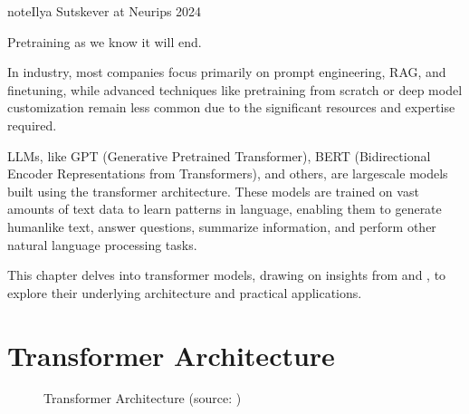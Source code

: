 \documentclass[letterpaper,11pt,english]{sphinxmanual}
\begin{document}
\begin{sphinxadmonition}{note}{Ilya Sutskever at Neurips 2024}

\sphinxAtStartPar
Pre\sphinxhyphen{}training as we know it will end.

\begin{figure}[H]
\centering

\noindent{}
\end{figure}
\end{sphinxadmonition}

\sphinxAtStartPar
In industry, most companies focus primarily on prompt engineering, RAG, and fine\sphinxhyphen{}tuning,
while advanced techniques like pre\sphinxhyphen{}training from scratch or deep model customization
remain less common due to the significant resources and expertise required.

\sphinxAtStartPar
LLMs, like GPT (Generative Pre\sphinxhyphen{}trained Transformer), BERT (Bidirectional Encoder
Representations from Transformers), and others, are large\sphinxhyphen{}scale models built using
the transformer architecture. These models are trained on vast amounts of text data to
learn patterns in language, enabling them to generate human\sphinxhyphen{}like text, answer questions,
summarize information, and perform other natural language processing tasks.

\sphinxAtStartPar
This chapter delves into transformer models, drawing on insights from
 and , to explore their underlying architecture and practical applications.


\section{Transformer Architecture}
\label{\detokenize{pretraining:transformer-architecture}}
\begin{figure}[htbp]
\centering
\capstart

\noindent{}
\caption{Transformer Architecture (source: )}\label{\detokenize{pretraining:id10}}\end{figure}
\end{document}

